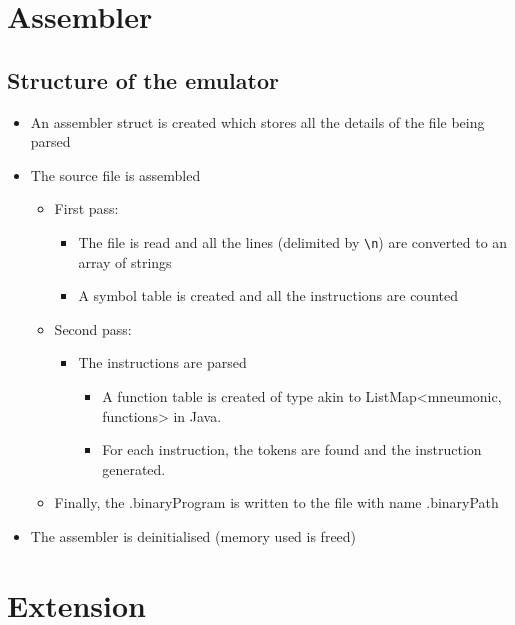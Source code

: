 \documentclass[11pt]{article}
\begin{document}
\section{Assembler}

\subsection{Structure of the emulator}

\begin{itemize}

    \item An assembler struct is created which stores all the details of the file being parsed
    \item The source file is assembled
    
    \begin{itemize}
    
        \item First pass:
        
        \begin{itemize}
        
            \item The file is read and all the lines (delimited by \texttt{\textbackslash n}) are converted to an array of strings
            \item A symbol table is created and all the instructions are counted
            
        \end{itemize}
        
        \item Second pass:
        
        \begin{itemize}
        
            \item The instructions are parsed 
            
            \begin{itemize}
        
                \item A function table is created of type akin to ListMap<mneumonic, functions> in Java.
                \item For each instruction, the tokens are found and the instruction generated.
            
            \end{itemize}
            
        \end{itemize}
    
        
        \item Finally, the .binaryProgram is written to the file with name .binaryPath
    
    \end{itemize}
    
    \item The assembler is deinitialised (memory used is freed)

\end{itemize}

\section{Extension}
\end{document}
